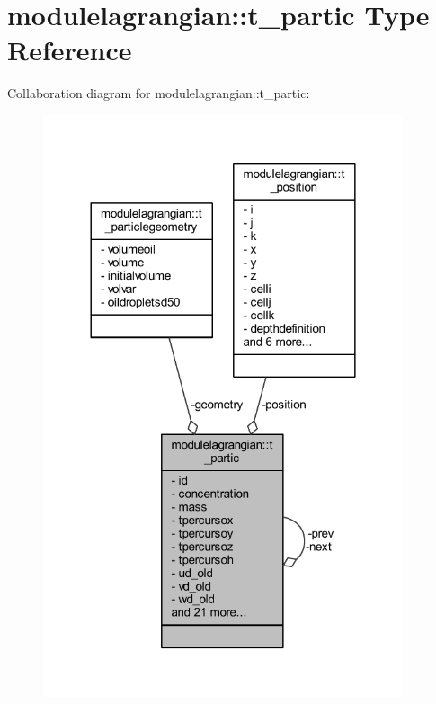 \hypertarget{structmodulelagrangian_1_1t__partic}{}\section{modulelagrangian\+:\+:t\+\_\+partic Type Reference}
\label{structmodulelagrangian_1_1t__partic}


Collaboration diagram for modulelagrangian\+:\+:t\+\_\+partic\+:\nopagebreak
\begin{figure}[H]
\begin{center}
\leavevmode
\includegraphics[width=300pt]{structmodulelagrangian_1_1t__partic__coll__graph}
\end{center}
\end{figure}
